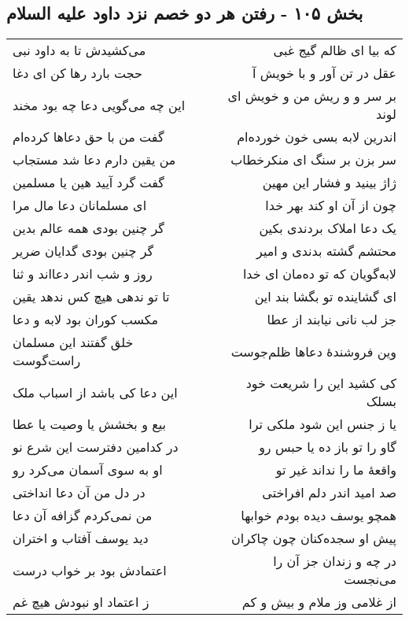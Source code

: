 \begin{center}
\section*{بخش ۱۰۵ - رفتن هر دو خصم نزد داود علیه السلام}
\label{sec:sh105}
\begin{longtable}{l p{0.5cm} r}
می‌کشیدش تا به داود نبی
&&
که بیا ای ظالم گیج غبی
\\
حجت بارد رها کن ای دغا
&&
عقل در تن آور و با خویش آ
\\
این چه می‌گویی دعا چه بود مخند
&&
بر سر و و ریش من و خویش ای لوند
\\
گفت من با حق دعاها کرده‌ام
&&
اندرین لابه بسی خون خورده‌ام
\\
من یقین دارم دعا شد مستجاب
&&
سر بزن بر سنگ ای منکرخطاب
\\
گفت گرد آیید هین یا مسلمین
&&
ژاژ بینید و فشار این مهین
\\
ای مسلمانان دعا مال مرا
&&
چون از آن او کند بهر خدا
\\
گر چنین بودی همه عالم بدین
&&
یک دعا املاک بردندی بکین
\\
گر چنین بودی گدایان ضریر
&&
محتشم گشته بدندی و امیر
\\
روز و شب اندر دعااند و ثنا
&&
لابه‌گویان که تو ده‌مان ای خدا
\\
تا تو ندهی هیچ کس ندهد یقین
&&
ای گشاینده تو بگشا بند این
\\
مکسب کوران بود لابه و دعا
&&
جز لب نانی نیابند از عطا
\\
خلق گفتند این مسلمان راست‌گوست
&&
وین فروشندهٔ دعاها ظلم‌جوست
\\
این دعا کی باشد از اسباب ملک
&&
کی کشید این را شریعت خود بسلک
\\
بیع و بخشش یا وصیت یا عطا
&&
یا ز جنس این شود ملکی ترا
\\
در کدامین دفترست این شرع نو
&&
گاو را تو باز ده یا حبس رو
\\
او به سوی آسمان می‌کرد رو
&&
واقعهٔ ما را نداند غیر تو
\\
در دل من آن دعا انداختی
&&
صد امید اندر دلم افراختی
\\
من نمی‌کردم گزافه آن دعا
&&
همچو یوسف دیده بودم خوابها
\\
دید یوسف آفتاب و اختران
&&
پیش او سجده‌کنان چون چاکران
\\
اعتمادش بود بر خواب درست
&&
در چه و زندان جز آن را می‌نجست
\\
ز اعتماد او نبودش هیچ غم
&&
از غلامی وز ملام و بیش و کم
\\

\end{longtable}
\end{center}
